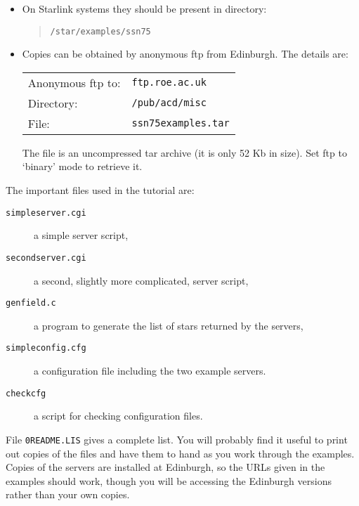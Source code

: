 \documentclass[twoside,11pt]{article}
\renewcommand{\_}{\texttt{\symbol{95}}}
\begin{document}
\begin{itemize}

  \item On Starlink systems they should be present in directory:

  \begin{quote}
   {\tt /star/examples/ssn75}
  \end{quote}

  \item Copies can be obtained by anonymous ftp from Edinburgh.  The
   details are:

  \begin{tabular}{ll}
   Anonymous ftp to: & {\tt ftp.roe.ac.uk}    \\
   Directory:        & {\tt /pub/acd/misc}    \\
   File:             & {\tt ssn75\_examples.tar} \\
  \end{tabular}

   The file is an uncompressed tar archive (it is only 52 Kb in size).
   Set ftp to `binary' mode to retrieve it.

\end{itemize}

The important files used in the tutorial are:

\begin{description}

  \item[{\tt simpleserver.cgi}] a simple server script,

  \item[{\tt secondserver.cgi}] a second, slightly more complicated, server
   script,

  \item[{\tt genfield.c}] a program to generate the list of stars returned
   by the servers,

  \item[{\tt simpleconfig.cfg}] a configuration file including the two
   example servers.

  \item[{\tt checkcfg}] a script for checking configuration files.

\end{description}

File {\tt 0README.LIS} gives a complete list.  You will probably find it
useful to print out copies of the files and have them to hand as you work
through the examples.  Copies of the servers are installed at Edinburgh, so
the URLs given in the examples should work, though you will be accessing
the Edinburgh versions rather than your own copies.
\end{document}
